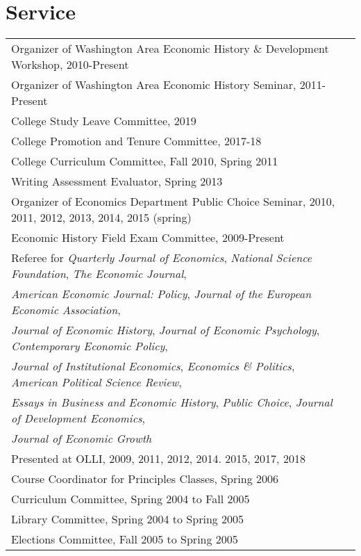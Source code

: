 \documentclass[11pt,fullpage]{article}
\begin{document}

\section*{Service}

\begin{tabular}{ll}
	Organizer of Washington Area Economic History \& Development Workshop, 2010-Present \\
	Organizer of Washington Area Economic History Seminar, 2011-Present \\
	College Study Leave Committee, 2019 \\
	College Promotion and Tenure Committee, 2017-18 \\
	College Curriculum Committee, Fall 2010, Spring 2011 \\
	Writing Assessment Evaluator, Spring 2013 \\ 
	Organizer of Economics Department Public Choice Seminar, 2010, 2011, 2012, 2013, 2014, 2015 (spring) \\
	Economic History Field Exam Committee, 2009-Present \\
	Referee for \textit{Quarterly Journal of Economics}, \textit{National Science Foundation}, \textit{The Economic Journal}, \\\textit{American Economic Journal:  Policy},  \textit{Journal of the European Economic Association}, \\\textit{Journal of Economic History}, \textit{Journal of Economic Psychology}, \textit{Contemporary Economic Policy},\\ \textit{Journal of Institutional Economics}, \textit{Economics \& Politics}, \textit{American Political Science Review}, \\ \textit{Essays in Business and Economic History}, \textit{Public Choice}, \textit{Journal of Development Economics}, \\ \textit{Journal of Economic Growth} \\ 
	Presented at OLLI, 2009, 2011, 2012, 2014. 2015, 2017, 2018 \\ 
	Course Coordinator for Principles Classes, Spring 2006 \\
	Curriculum Committee, Spring 2004 to Fall 2005 \\
	Library Committee, Spring 2004 to Spring 2005 \\
	Elections Committee, Fall 2005 to Spring 2005 \\
\end{tabular}	
	
\end{document}
